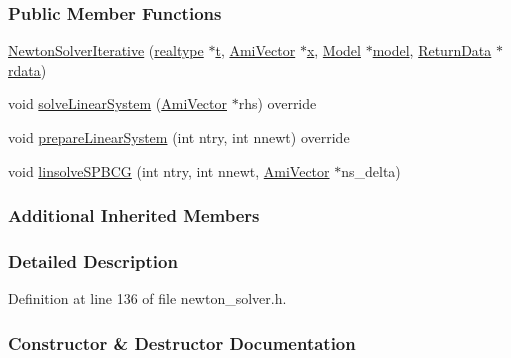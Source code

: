 \subsubsection*{Public Member Functions}
\begin{DoxyCompactItemize}
\item 
\mbox{\hyperlink{classamici_1_1_newton_solver_iterative_a8bea80f27022bfade8a19989cbb10058}{Newton\+Solver\+Iterative}} (\mbox{\hyperlink{namespaceamici_a1bdce28051d6a53868f7ccbf5f2c14a3}{realtype}} $\ast$\mbox{\hyperlink{classamici_1_1_newton_solver_ad94d61da9b85c1a151ffd8e228758c7c}{t}}, \mbox{\hyperlink{classamici_1_1_ami_vector}{Ami\+Vector}} $\ast$\mbox{\hyperlink{classamici_1_1_newton_solver_af64268982dd7b9be1690573763982e0b}{x}}, \mbox{\hyperlink{classamici_1_1_model}{Model}} $\ast$\mbox{\hyperlink{classamici_1_1_newton_solver_a7b56c3ca57dde73bdbc8dbe9772bca19}{model}}, \mbox{\hyperlink{classamici_1_1_return_data}{Return\+Data}} $\ast$\mbox{\hyperlink{classamici_1_1_newton_solver_a4c0807651f0594a186e8856f22e442cc}{rdata}})
\item 
void \mbox{\hyperlink{classamici_1_1_newton_solver_iterative_aa4a6695d71f00ec1b46e94b33e55660f}{solve\+Linear\+System}} (\mbox{\hyperlink{classamici_1_1_ami_vector}{Ami\+Vector}} $\ast$rhs) override
\item 
void \mbox{\hyperlink{classamici_1_1_newton_solver_iterative_a0b900656d018299b08d0f027e95bd347}{prepare\+Linear\+System}} (int ntry, int nnewt) override
\item 
void \mbox{\hyperlink{classamici_1_1_newton_solver_iterative_a89a318e506339bc8a0d05aa01920f1ae}{linsolve\+S\+P\+B\+CG}} (int ntry, int nnewt, \mbox{\hyperlink{classamici_1_1_ami_vector}{Ami\+Vector}} $\ast$ns\+\_\+delta)
\end{DoxyCompactItemize}
\subsubsection*{Additional Inherited Members}


\subsubsection{Detailed Description}


Definition at line 136 of file newton\+\_\+solver.\+h.



\subsubsection{Constructor \& Destructor Documentation}
\mbox{\label{classamici_1_1_newton_solver_iterative_a8bea80f27022bfade8a19989cbb10058}} 

